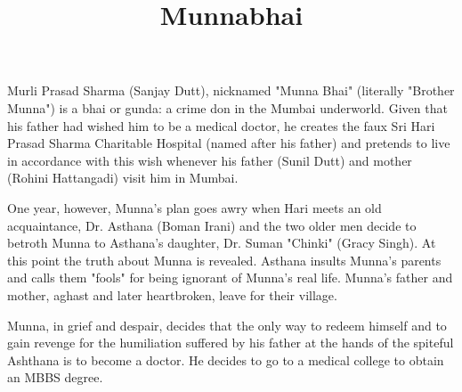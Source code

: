\documentclass{article}
\title{Munnabhai}
\begin{document}
	Murli Prasad Sharma (Sanjay Dutt), nicknamed "Munna Bhai" (literally "Brother Munna") is a bhai or gunda: a crime don in the Mumbai underworld. Given that his father had wished him to be a medical doctor, he creates the faux Sri Hari Prasad Sharma Charitable Hospital (named after his father) and pretends to live in accordance with this wish whenever his father (Sunil Dutt) and mother (Rohini Hattangadi) visit him in Mumbai.
	
	One year, however, Munna's plan goes awry when Hari meets an old acquaintance, Dr. Asthana (Boman Irani) and the two older men decide to betroth Munna to Asthana's daughter, Dr. Suman "Chinki" (Gracy Singh). At this point the truth about Munna is revealed. Asthana insults Munna's parents and calls them "fools" for being ignorant of Munna's real life. Munna's father and mother, aghast and later heartbroken, leave for their village.
	
	Munna, in grief and despair, decides that the only way to redeem himself and to gain revenge for the humiliation suffered by his father at the hands of the spiteful Ashthana is to become a doctor. He decides to go to a medical college to obtain an MBBS degree.
\end{document}
